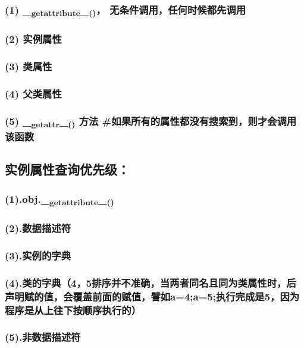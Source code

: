 \documentclass[11pt]{article}
\begin{document}
\subsubsection{(1) \_\textsubscript{getattribute}\_\textsubscript{()}， 无条件调用，任何时候都先调用}
\label{sec:orgdd3828e}
\subsubsection{(2) 实例属性}
\label{sec:orgc5c42b1}
\subsubsection{(3) 类属性}
\label{sec:org1dcbce5}
\subsubsection{(4) 父类属性}
\label{sec:org453e0da}
\subsubsection{(5) \_\textsubscript{getattr}\_\textsubscript{()} 方法  \#如果所有的属性都没有搜索到，则才会调用该函数}
\label{sec:org8020062}
\subsection{实例属性查询优先级：}
\label{sec:org5bbbb8e}
\subsubsection{(1).obj.\_\textsubscript{getattribute}\_\textsubscript{()}}
\label{sec:org741a522}
\subsubsection{(2).数据描述符}
\label{sec:orga93c89b}
\subsubsection{(3).实例的字典}
\label{sec:orgf404631}
\subsubsection{(4).类的字典（4，5排序并不准确，当两者同名且同为类属性时，后声明赋的值，会覆盖前面的赋值，譬如a=4;a=5;执行完成是5，因为程序是从上往下按顺序执行的）}
\label{sec:orgeda68bb}
\subsubsection{(5).非数据描述符}
\label{sec:orgcaf21f4}
\end{document}
